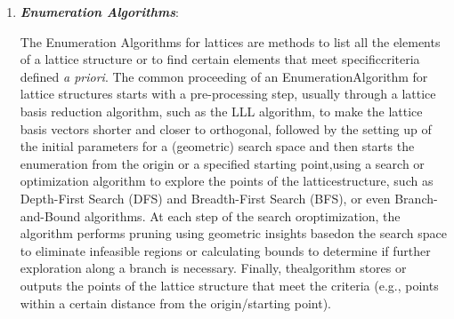 \documentclass[runningheads]{llncs}
\numberwithin{equation}{section}
\begin{document}
    \begin{enumerate}
        \item \textbf{\textit{Enumeration Algorithms}}:
        \vspace{0.6ex}

        The Enumeration Algorithms for lattices \cite{fincke-pohst:improved-methods-calculating-vectors-short-length-lattice-including-complexity-analysis:1985:06-2024,kannan:minkowski-convex-body-theorem-and-integer-programming:1987:06-2024,hanrot-stehle:improved-analysis-kannan-shortest-lattice-vector-algorithms:2007:06-2024,pujol-stehle:rigorous-and-efficient-short-lattice-vectors-enumeration:2008:06-2024,micciancio-walter:fast-lattice-point-enumeration-minimal-overhead:2015:06-2024} are methods to list all the elements of a lattice structure or to find certain elements that meet specific\break criteria defined \textit{a priori}. The common proceeding of an Enumeration\break Algorithm for lattice structures starts with a pre-processing step, usually through a lattice basis reduction algorithm, such as the LLL algorithm, to make the lattice basis vectors shorter and closer to orthogonal, followed by the setting up of the initial parameters for a (geometric) search space and then starts the enumeration from the origin or a specified starting point,\break using a search or optimization algorithm to explore the points of the lattice\break structure, such as Depth-First Search (DFS) and Breadth-First Search (BFS), or even Branch-and-Bound algorithms. At each step of the search or\break optimization, the algorithm performs pruning using geometric insights based\break on the search space to eliminate infeasible regions or calculating bounds to determine if further exploration along a branch is necessary. Finally, the\break algorithm stores or outputs the points of the lattice structure that meet the criteria (e.g., points within a certain distance from the origin/starting point).
        

\end{enumerate}
\end{document}
